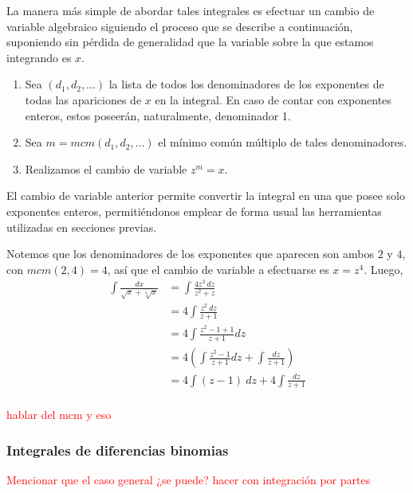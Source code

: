La manera más simple de abordar tales integrales es efectuar un cambio de variable algebraico siguiendo el proceso que se describe a continuación, suponiendo sin pérdida de generalidad que la variable sobre la que estamos integrando es $x$.
\begin{enumerate}
	\item Sea $(d_1,d_2,\ldots)$ la lista de todos los denominadores de los exponentes de todas las apariciones de $x$ en la integral. En caso de contar con exponentes enteros, estos poseerán, naturalmente, denominador 1.
	\item Sea $m=mcm(d_1,d_2,\ldots)$ el mínimo común múltiplo de tales denominadores.
	\item Realizamos el cambio de variable $z^m=x$.
\end{enumerate}
El cambio de variable anterior permite convertir la integral en una que posee solo exponentes enteros, permitiéndonos emplear de forma usual las herramientas utilizadas en secciones previas.
\begin{problema}
	Notemos que los denominadores de los exponentes que aparecen son ambos $2$ y $4$, con $mcm(2,4)=4$, así que el cambio de variable a efectuarse es $x=z^4$. Luego,
	\begin{align*}
		\int \frac{dx}{\sqrt{x}+\sqrt[4]{x}}&=\int \frac{4z^3\:dz}{z^2+z}\\
									&=4\int \frac{z^2\:dz}{z+1}\\
									&=4\int \frac{z^2-1+1}{z+1}dz\\
									&=4\left(\int \frac{z^2-1}{z+1}dz+\int\frac{dz}{z+1}\right)\\
									&=4\int (z-1)\:dz+4\int\frac{dz}{z+1}	\\
	\end{align*}
\end{problema}

\textcolor{red}{hablar del mcm y eso}
\subsubsection{Integrales de diferencias binomias}
\textcolor{red}{Mencionar que el caso general ¿se puede? hacer con integración por partes}
\newpage